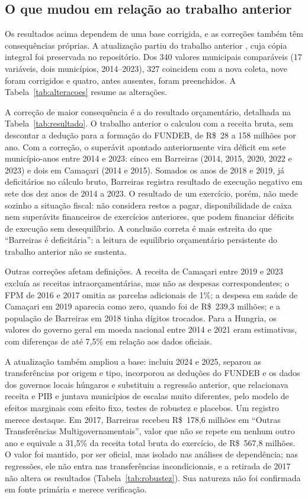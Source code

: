 \subsection{O que mudou em relação ao trabalho anterior}

Os resultados acima dependem de uma base corrigida, e as correções também têm consequências próprias. A atualização partiu do trabalho anterior \citep{DutraP1}, cuja cópia integral foi preservada no repositório. Dos 340 valores municipais comparáveis (17 variáveis, dois municípios, 2014--2023), 327 coincidem com a nova coleta, nove foram corrigidos e quatro, antes ausentes, foram preenchidos. A Tabela~\ref{tab:alteracoes} resume as alterações.



A correção de maior consequência é a do resultado orçamentário, detalhada na Tabela~\ref{tab:resultado}. O trabalho anterior o calculou com a receita bruta, sem descontar a dedução para a formação do FUNDEB, de R\$~28 a 158 milhões por ano. Com a correção, o superávit apontado anteriormente vira déficit em sete município-anos entre 2014 e 2023: cinco em Barreiras (2014, 2015, 2020, 2022 e 2023) e dois em Camaçari (2014 e 2015). Somados os anos de 2018 e 2019, já deficitários no cálculo bruto, Barreiras registra resultado de execução negativo em sete dos dez anos de 2014 a 2023. O resultado de um exercício, porém, não mede sozinho a situação fiscal: não considera restos a pagar, disponibilidade de caixa nem superávits financeiros de exercícios anteriores, que podem financiar déficits de execução sem desequilíbrio. A conclusão correta é mais estreita do que ``Barreiras é deficitária'': a leitura de equilíbrio orçamentário persistente do trabalho anterior não se sustenta.



Outras correções afetam definições. A receita de Camaçari entre 2019 e 2023 excluía as receitas intraorçamentárias, mas não as despesas correspondentes; o FPM de 2016 e 2017 omitia as parcelas adicionais de 1\%; a despesa em saúde de Camaçari em 2019 aparecia como zero, quando foi de R\$~239,3 milhões; e a população de Barreiras em 2018 tinha dígitos trocados. Para a Hungria, os valores do governo geral em moeda nacional entre 2014 e 2021 eram estimativas, com diferenças de até 7,5\% em relação aos dados oficiais.

A atualização também ampliou a base: incluiu 2024 e 2025, separou as transferências por origem e tipo, incorporou as deduções do FUNDEB e os dados dos governos locais húngaros e substituiu a regressão anterior, que relacionava receita e PIB e juntava municípios de escalas muito diferentes, pelo modelo de efeitos marginais com efeito fixo, testes de robustez e placebos. Um registro merece destaque. Em 2017, Barreiras recebeu R\$~178,6 milhões em ``Outras Transferências Multigovernamentais'', valor que não se repete em nenhum outro ano e equivale a 31,5\% da receita total bruta do exercício, de R\$~567,8 milhões. O valor foi mantido, por ser oficial, mas isolado nas análises de dependência; nas regressões, ele não entra nas transferências incondicionais, e a retirada de 2017 não altera os resultados (Tabela~\ref{tab:robustez}). Sua natureza não foi confirmada em fonte primária e merece verificação.
